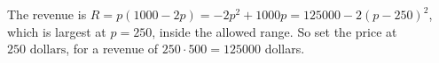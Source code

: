 The revenue is $R=p(1000-2p)=-2p^2+1000p=125000-2(p-250)^2$, which is largest at $p=250$, inside the allowed range. So set the price at $\boxed{250\text{ dollars}}$, for a revenue of $250\cdot500=\boxed{125000}$ dollars.
